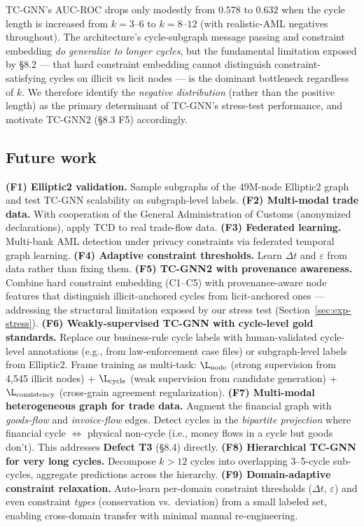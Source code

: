 \documentclass[journal,onecolumn]{IEEEtran}
\newcommand{\eps}{\varepsilon}
\begin{document}
TC-GNN's AUC-ROC drops only modestly from $0.578$ to $0.632$ when
the cycle length is increased from $k = 3$--$6$ to $k = 8$--$12$ (with
realistic-AML negatives throughout). The architecture's
cycle-subgraph message passing and constraint embedding \emph{do
generalize to longer cycles}, but the fundamental limitation exposed
by §8.2 --- that hard constraint embedding cannot distinguish
constraint-satisfying cycles on illicit vs licit nodes --- is the
dominant bottleneck regardless of $k$. We therefore identify the
\emph{negative distribution} (rather than the positive length) as
the primary determinant of TC-GNN's stress-test performance, and
motivate \textsc{TC-GNN}2 (§8.3 F5) accordingly.

\subsection{Future work}
\label{sec:conclusion-future}

\textbf{(F1) Elliptic2 validation.} Sample subgraphs of the 49M-node
Elliptic2 graph and test TC-GNN scalability on subgraph-level labels.
\textbf{(F2) Multi-modal trade data.} With cooperation of the General
Administration of Customs (anonymized declarations), apply TCD to real
trade-flow data. \textbf{(F3) Federated learning.} Multi-bank AML detection
under privacy constraints via federated temporal graph learning.
\textbf{(F4) Adaptive constraint thresholds.} Learn $\Delta t$ and $\eps$
from data rather than fixing them. \textbf{(F5) \textsc{TC-GNN}2 with
provenance awareness.} Combine hard constraint embedding (C1--C5) with
provenance-aware node features that distinguish illicit-anchored cycles
from licit-anchored ones --- addressing the structural limitation exposed
by our stress test (Section~\ref{sec:exp-stress}). \textbf{(F6)
Weakly-supervised TC-GNN with cycle-level gold standards.} Replace our
business-rule cycle labels with human-validated cycle-level annotations
(e.g., from law-enforcement case files) or subgraph-level labels from
Elliptic2. Frame training as multi-task: $\L_{\text{node}}$ (strong
supervision from 4{,}545 illicit nodes) + $\L_{\text{cycle}}$
(weak supervision from candidate generation) + $\L_{\text{consistency}}$
(cross-grain agreement regularization). \textbf{(F7) Multi-modal
heterogeneous graph for trade data.} Augment the financial graph
with \emph{goods-flow} and \emph{invoice-flow} edges. Detect cycles in
the \emph{bipartite projection} where financial cycle $\Leftrightarrow$
physical non-cycle (i.e., money flows in a cycle but goods don't).
This addresses \textbf{Defect T3} (§8.4) directly. \textbf{(F8)
Hierarchical TC-GNN for very long cycles.} Decompose $k > 12$
cycles into overlapping 3--5-cycle sub-cycles, aggregate predictions
across the hierarchy. \textbf{(F9) Domain-adaptive constraint
relaxation.} Auto-learn per-domain constraint thresholds ($\Delta t$,
$\eps$) and even constraint \emph{types} (conservation vs.\ deviation)
from a small labeled set, enabling cross-domain transfer with minimal
manual re-engineering.
\end{document}
